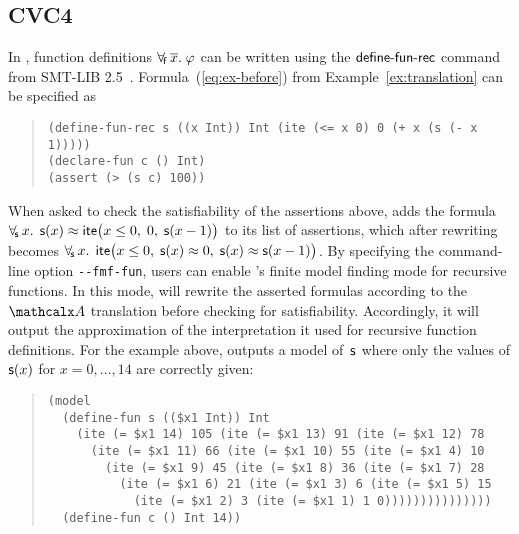 
\subsection{CVC4}
\label{ssec:cvc4}


In \cvc, function definitions $\forall_{\!\mathsf{f}\:} \overline{x}.\; \varphi$ can be written using the $\mathsf{define}\text{-}\mathsf{fun}\text{-}\mathsf{rec}$ command
from SMT-LIB 2.5~\cite{smtlib25}.
Formula~(\ref{eq:ex-before}) from Example~\ref{ex:translation}
can be specified as %
%
\begin{quote}
\verb|(define-fun-rec s ((x Int)) Int (ite (<= x 0) 0 (+ x (s (- x 1)))))|\kern-200mm \\
\verb|(declare-fun c () Int)| \\
\verb|(assert (> (s c) 100))| %
\end{quote}
%
When asked to check the satisfiability of the assertions above,
\cvc adds the formula
$\forall_{\!\mathsf{s}\:} x.\;\, \mathsf{s}( x ) \approx \mathsf{ite}\bigl( x \leq 0,\; 0,\; \mathsf{s}( x-1 )\bigr)$
to its list of assertions,
which after rewriting becomes
$\forall_{\!\mathsf{s}\:} x.\;\, \mathsf{ite}\bigl( x \leq 0,\; \mathsf{s}( x ) \approx 0,\; \mathsf{s}( x ) \approx \mathsf{s}( x-1 ) \bigr)$.
By specifying the command-line option \texttt{-}\texttt{-fmf-fun}, users
can enable \cvc's finite model finding mode for recursive functions.
In this mode, \cvc will rewrite the asserted formulas according to the $\conv$ translation 
before checking for satisfiability.
Accordingly, it will output the approximation of the interpretation it
used for recursive function definitions.
For the example above, \cvc outputs a %
model of~$\mathsf{s}$ where only
the values of $\mathsf{s}(x)$ for $x = 0,\dotsc,14$ are correctly given:
\begin{quote}
\begin{verbatim}
(model
  (define-fun s (($x1 Int)) Int
    (ite (= $x1 14) 105 (ite (= $x1 13) 91 (ite (= $x1 12) 78
      (ite (= $x1 11) 66 (ite (= $x1 10) 55 (ite (= $x1 4) 10
        (ite (= $x1 9) 45 (ite (= $x1 8) 36 (ite (= $x1 7) 28
          (ite (= $x1 6) 21 (ite (= $x1 3) 6 (ite (= $x1 5) 15
            (ite (= $x1 2) 3 (ite (= $x1 1) 1 0)))))))))))))))
  (define-fun c () Int 14))
\end{verbatim}
\end{quote}


